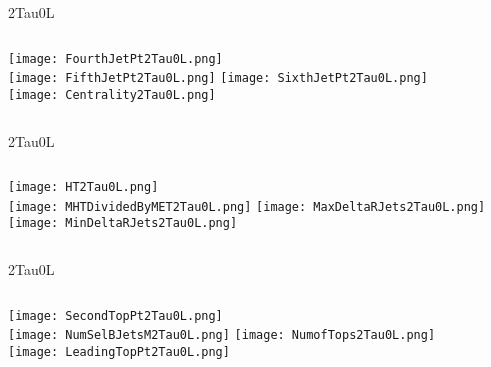 \documentclass{beamer}
\begin{document}
\begin{frame}{2Tau0L}
    \begin{columns}[t]
    \centering
    \texttt{[image: FourthJetPt2Tau0L.png]}\\
    \texttt{[image: FifthJetPt2Tau0L.png]}
    \centering
    \texttt{[image: SixthJetPt2Tau0L.png]}\\
    \texttt{[image: Centrality2Tau0L.png]}
    \end{columns}
\end{frame}
\begin{frame}{2Tau0L}
    \begin{columns}[t]
    \centering
    \texttt{[image: HT2Tau0L.png]}\\
    \texttt{[image: MHTDividedByMET2Tau0L.png]}
    \centering
    \texttt{[image: MaxDeltaRJets2Tau0L.png]}\\
    \texttt{[image: MinDeltaRJets2Tau0L.png]}
    \end{columns}
\end{frame}
\begin{frame}{2Tau0L}
    \begin{columns}[t]
    \centering
    \texttt{[image: SecondTopPt2Tau0L.png]}\\
    \texttt{[image: NumSelBJetsM2Tau0L.png]}
    \centering
    \texttt{[image: NumofTops2Tau0L.png]}\\
    \texttt{[image: LeadingTopPt2Tau0L.png]}
    \end{columns}
\end{frame}
\end{document}
